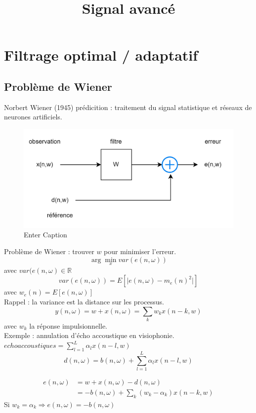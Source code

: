 \documentclass[12pt]{article}
\title{Signal avancé}
\begin{document}
\maketitle

\section{Filtrage optimal / adaptatif}
\subsection{Problème de Wiener}
Norbert Wiener (1945) prédicition : traitement du signal statistique et réseaux de neurones artificiels.

\begin{figure}[H]
    \centering
    \includegraphics[width=0.8\linewidth]{image.png}
    \caption{Enter Caption}
    \label{fig:enter-label}
\end{figure}
Problème de Wiener : trouver $w$ pour minimiser l'erreur.
\begin{equation}
   \arg \min_{x} var(e(n,\omega)) \nonumber
\end{equation}
avec $var(e(n,\omega) \in \mathbb{R}$ 
$$var(e(n,\omega)) = E[\lvert e(n,\omega)-m_e(n)^2 \rvert]$$
avec $w_e(n) = E[e(n,\omega)]$\\
Rappel : la variance est la distance sur les processus. 
$$y(n,\omega) = w+ x(n,\omega) = \sum_k w_k x(n-k,w)$$ avec $w_k$ la réponse impulsionnelle.\\
Exemple : annulation d'écho accoustique en visiophonie.\\
$echoaccoustiques = \sum_{l=1}^L \alpha_l x(n-l,w)$
$$d(n,\omega) = b(n,\omega) + \sum_{l=1}^L \alpha_l x(n-l,w)$$

\begin{align}
        e(n,\omega) &= w + x(n,\omega) - d(n,\omega) \nonumber \\
        &= - b(n,\omega) + \sum_k (w_k - \alpha_k) x(n-k,w) \nonumber
\end{align}
Si $w_k = \alpha_k \Rightarrow e(n,\omega) = -b(n,\omega)$\\
\end{document}

